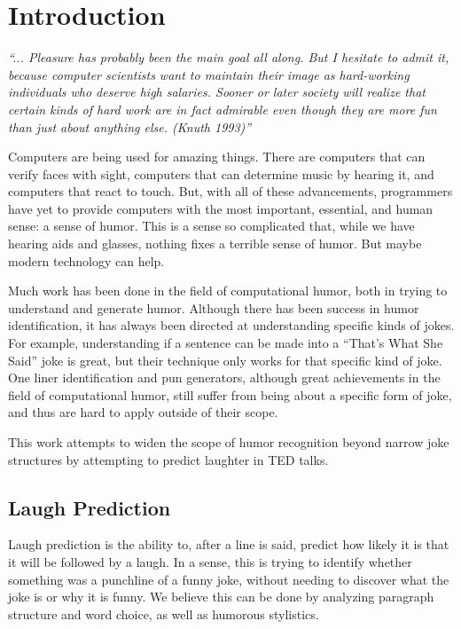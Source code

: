 \chapter{Introduction}

\textit{``... Pleasure has probably been the main goal all along. But I hesitate to admit it, because computer scientists want to maintain their image as hard-working individuals who deserve high salaries. Sooner or later society will realize that certain kinds of hard work are in fact admirable even though they are more fun than just about anything else. (Knuth 1993)''} \cite{oneliners}

Computers are being used for amazing things. There are computers that can verify faces with sight, computers that can determine music by hearing it, and computers that react to touch. But, with all of these advancements, programmers have yet to provide computers with the most important, essential, and human sense: a sense of humor. This is a sense so complicated that, while we have hearing aids and glasses, nothing fixes a terrible sense of humor. But maybe modern technology can help.

Much work has been done in the field of computational humor, both in trying to understand and generate humor. Although there has been success in humor identification, it has always been directed at understanding specific kinds of jokes. For example, understanding if a sentence can be made into a ``That's What She Said'' joke\cite{twss} is great, but their technique only works for that specific kind of joke. One liner identification \cite{oneliners} and pun generators, although great achievements in the field of computational humor, still suffer from being about a specific form of joke, and thus are hard to apply outside of their scope.

This work attempts to widen the scope of humor recognition beyond narrow joke structures by attempting to predict laughter in TED talks.

\section{Laugh Prediction}
Laugh prediction is the ability to, after a line is said, predict how likely it is that it will be followed by a laugh. In a sense, this is trying to identify whether something was a punchline of a funny joke, without needing to discover what the joke is or why it is funny. We believe this can be done by analyzing paragraph structure and word choice, as well as humorous stylistics.

